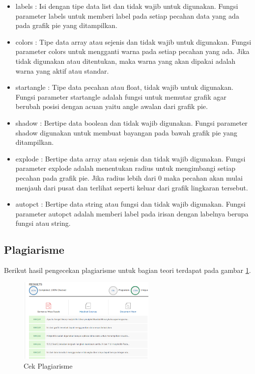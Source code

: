 \begin{itemize}
	\item labels : Isi dengan tipe data list dan tidak wajib untuk digunakan. Fungsi parameter labels untuk memberi label pada setiap pecahan data yang ada pada grafik pie yang ditampilkan.
	\item colors : Tipe data array atau sejenis dan tidak wajib untuk digunakan. Fungsi parameter colors untuk mengganti warna pada setiap pecahan yang ada. Jika tidak digunakan atau ditentukan, maka warna yang akan dipakai adalah warna yang aktif atau standar.
	\item startangle : Tipe data pecahan atau float, tidak wajib untuk digunakan. Fungsi parameter startangle adalah fungsi untuk memutar grafik agar berubah posisi dengan acuan yaitu angle awalan dari grafik pie.
	\item shadow : Bertipe data boolean dan tidak wajib digunakan. Fungsi parameter shadow digunakan untuk membuat bayangan pada bawah grafik pie yang ditampilkan. 
	\item explode : Bertipe data array atau sejenis dan tidak wajib digunakan. Fungsi parameter explode adalah menentukan radius untuk mengimbangi setiap pecahan pada grafik pie. Jika radius lebih dari 0 maka pecahan akan mulai menjauh dari pusat dan terlihat seperti keluar dari grafik lingkaran tersebut.
	\item autopct : Bertipe data string atau fungsi dan tidak wajib digunakan. Fungsi parameter autopct adalah memberi label pada irisan dengan labelnya berupa fungsi atau string. 
\end{itemize}

\subsection{Plagiarisme}
Berikut hasil pengecekan plagiarisme untuk bagian teori terdapat pada gambar \ref{Plagiarisme}.
\begin{figure} [ht]
	\centerline{\includegraphics[width=0.6\textwidth]{figures/6/1174035/Teori/Plagiarisme.png}}
	\caption{Cek Plagiarisme}
	\label{Plagiarisme}
\end{figure}